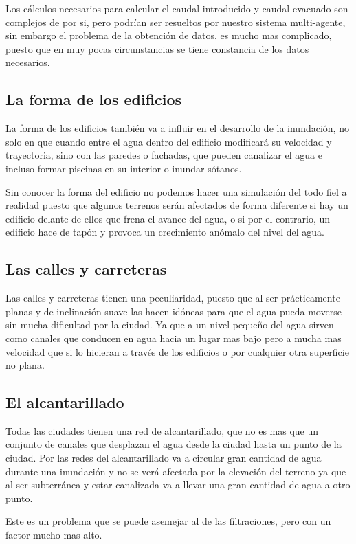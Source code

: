 Los cálculos necesarios para calcular el caudal introducido y caudal evacuado
\cite{desvordamiento} son complejos de por si, pero podrían ser resueltos por
nuestro sistema multi-agente, sin embargo el problema de la obtención de datos,
es mucho mas complicado, puesto que en muy pocas circunstancias se tiene
constancia de los datos necesarios.

\subsection*{La forma de los edificios}
La forma de los edificios también va a influir en el desarrollo de la
inundación, no solo en que cuando entre el agua dentro del edificio modificará
su velocidad y trayectoria, sino con las paredes o fachadas, que pueden
canalizar el agua e incluso formar piscinas en su interior o inundar sótanos.

Sin conocer la forma del edificio no podemos hacer una simulación del todo fiel
a realidad puesto que algunos terrenos serán afectados de forma diferente si
hay un edificio delante de ellos que frena el avance del agua, o si por el
contrario, un edificio hace de tapón y provoca un crecimiento anómalo del nivel
del agua.

\subsection*{Las calles y carreteras}
Las calles y carreteras tienen una peculiaridad, puesto que al ser
prácticamente planas y de inclinación suave las hacen idóneas para que el agua
pueda moverse sin mucha dificultad por la ciudad. Ya que a un nivel pequeño del
agua sirven como canales que conducen en agua hacia un lugar mas bajo pero a
mucha mas velocidad que si lo hicieran a través de los edificios o por cualquier
otra superficie no plana.

\subsection*{El alcantarillado}
Todas las ciudades tienen una red de alcantarillado, que no es mas que un
conjunto de canales que desplazan el agua desde la ciudad hasta un punto de la
ciudad. Por las redes del alcantarillado va a circular gran cantidad de agua
durante una inundación y no se verá afectada por la elevación del terreno ya
que al ser subterránea y estar canalizada va a llevar una gran cantidad de agua
a otro punto.

Este es un problema que se puede asemejar al de las filtraciones, pero con un
factor mucho mas alto.

